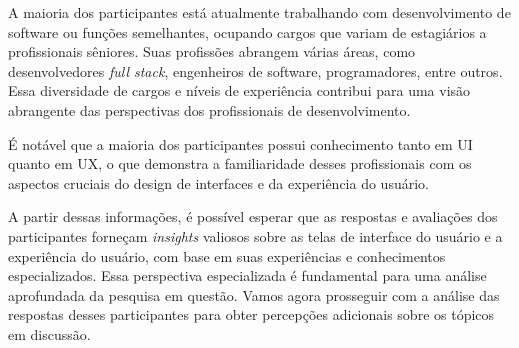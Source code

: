 A maioria dos participantes está atualmente trabalhando com desenvolvimento de software ou funções semelhantes, ocupando cargos que variam de estagiários a profissionais sêniores. Suas profissões abrangem várias áreas, como desenvolvedores \textit{full stack}, engenheiros de software, programadores, entre outros. Essa diversidade de cargos e níveis de experiência contribui para uma visão abrangente das perspectivas dos profissionais de desenvolvimento.

É notável que a maioria dos participantes possui conhecimento tanto em \ac{UI} quanto em \ac{UX}, o que demonstra a familiaridade desses profissionais com os aspectos cruciais do design de interfaces e da experiência do usuário.

A partir dessas informações, é possível esperar que as respostas e avaliações dos participantes forneçam \textit{insights} valiosos sobre as telas de interface do usuário e a experiência do usuário, com base em suas experiências e conhecimentos especializados. Essa perspectiva especializada é fundamental para uma análise aprofundada da pesquisa em questão. Vamos agora prosseguir com a análise das respostas desses participantes para obter percepções adicionais sobre os tópicos em discussão.

